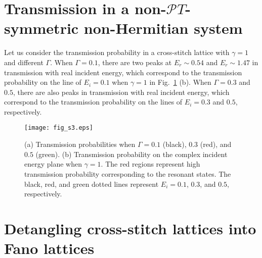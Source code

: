\documentclass[report,epsfig,pre]{revtex4}
\begin{document}
\section{Transmission in a non-$\mathcal PT$-symmetric non-Hermitian system}

Let us consider the transmission probability in a cross-stitch lattice with $\gamma = 1$ and different $\Gamma$. When $\Gamma=0.1$, there are two peaks at $E_{r} \sim 0.54$ and $E_{r} \sim 1.47$ in transmission with real incident energy, which correspond to the transmission probability on the line of $E_{i} = 0.1$ when $\gamma = 1$ in Fig.~\ref{fig_s3} (b). When $\Gamma=0.3$ and $0.5$, there are also peaks in transmission with real incident energy, which correspond to the transmission probability on the lines of $E_{i} = 0.3$ and $0.5$, respectively.

\begin{figure}
\begin{center}
\texttt{[image: fig\_s3.eps]}
\caption{
(a) Transmission probabilities when $\Gamma=0.1$ (black), $0.3$ (red), and $0.5$ (green).
(b) Transmission probability on the complex incident energy plane when $\gamma = 1$. The red regions represent high transmission probability corresponding to the resonant states.
The black, red, and green dotted lines represent $E_{i}=0.1$, $0.3$, and $0.5$, respectively.
}
\label{fig_s3}
\end{center}
\end{figure}

\section{Detangling cross-stitch lattices into Fano lattices}
\end{document}
